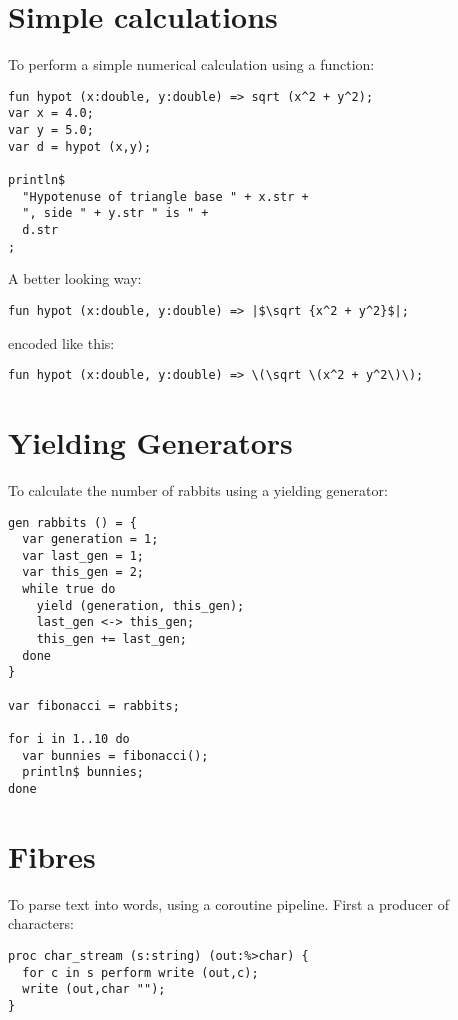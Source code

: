\documentclass[oneside]{book}
\begin{document}
\section{Simple calculations}
To perform a simple numerical calculation using a function:

\begin{verbatim}
fun hypot (x:double, y:double) => sqrt (x^2 + y^2);
var x = 4.0;
var y = 5.0;
var d = hypot (x,y);

println$ 
  "Hypotenuse of triangle base " + x.str + 
  ", side " + y.str " is " + 
  d.str
;
\end{verbatim}

A better looking way:

\begin{verbatim}
fun hypot (x:double, y:double) => |$\sqrt {x^2 + y^2}$|;
\end{verbatim}

encoded like this:

\begin{verbatim}
fun hypot (x:double, y:double) => \(\sqrt \(x^2 + y^2\)\);
\end{verbatim}

\section{Yielding Generators}
To calculate the number of rabbits using a yielding generator:

\begin{verbatim}
gen rabbits () = {
  var generation = 1;
  var last_gen = 1;
  var this_gen = 2;
  while true do
    yield (generation, this_gen);
    last_gen <-> this_gen;
    this_gen += last_gen;
  done
}

var fibonacci = rabbits;

for i in 1..10 do
  var bunnies = fibonacci(); 
  println$ bunnies;
done
\end{verbatim}

\section{Fibres}
To parse text into words, using a coroutine pipeline.
First a producer of characters:

\begin{verbatim}
proc char_stream (s:string) (out:%>char) {
  for c in s perform write (out,c);
  write (out,char "");
}
\end{verbatim}
\end{document}
